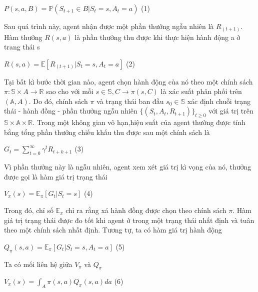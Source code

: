 \documentclass[14pt]{extreport}
\begin{document}
 \begin{center}
 $P(s,a,B)=\mathbb{P} (S_{t+1} \in B|S_t=s,A_t=a)$       (1)
 \end{center}
 
 Sau quá trình này, agent nhận được một phần thưởng ngẫu nhiên là $R_(t+1)$. Hàm thưởng $R(s,a)$ là phần thưởng thu được khi thực hiện hành động a ở trang thái s
 
 \begin{center}
 $R(s,a)=\mathbb{E}[R_(t+1)|S_t=s,A_t=a]$         (2)
 \end{center}
 
 Tại bất kì bước thời gian nào, agent chọn hành động của nó theo một chính sách $\pi: \mathbb{S} \times A \rightarrow \mathbb{R}$ sao cho với mỗi $s \in \mathbb{S},C \rightarrow \pi(s,C)$ là  xác suất phân phối trên $(\mathbb{A},A)$. Do đó, chính sách $\pi$ và trạng thái ban đầu $s_0 \in \mathbb{S}$ xác định chuỗi trạng thái - hành đồng - phần thưởng ngẫu nhiên $\{(S_t,A_t,R_{t+1})\}_{t \geq 0}$ với giá trị trên $\mathbb{S} \times \mathbb{A} \times \mathbb{R}$. Trong một không gian vô hạn,hiệu suất của agent thường được tính bằng tổng phần thưởng chiếu khấu thu được sau một chính sách là
 
 \begin{center}
 $G_t=\sum_{t=0}^ {\infty} \gamma ^t R_{t+k+1}$     (3)
 \end{center}
 
 Vì phần thưởng này là ngẫu nhiên, agent xem xét giá trị kì vọng của nó, thưởng được gọi là hàm giá trị trạng thái
 
 \begin{center}
 $V_ \pi (s)=\mathbb{E}_ \pi [G_t|S_t=s]$         (4) 
 \end{center}
 
 Trong đó, chỉ số $\mathbb{E}_ \pi$ chỉ ra rằng xá hành đồng được chọn theo chính sách $\pi$. Hàm giá trị trạng thái được đo tốt khi agent ở trong một trạng thái nhất định và tuân theo một chính sách nhất định. Tương tự, ta có hàm giá trị hành động
 
 \begin{center}
 $Q_ \pi (s,a)= \mathbb{E}_ \pi [G_t|S_t=s,A_t=a]$      (5)
 \end{center}
 
 Ta có mối liên hệ giữa $V_ \pi$ và $Q_ \pi$
 
 \begin{center}
 $V_ \pi (s)= \int _{A} \pi (s,a) Q_ \pi (s,a) da$      (6)
 \end{center}
 
\end{document}
